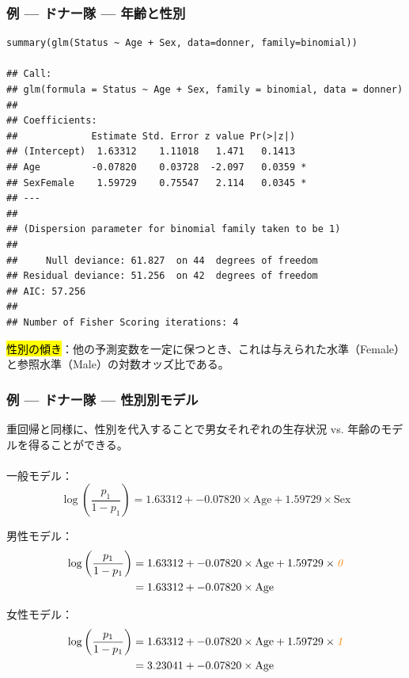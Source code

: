 
\begin{frame}[fragile]
\frametitle{例 --- ドナー隊 --- 年齢と性別}
\vspace{-3mm}
{\tiny
\begin{verbatim}
summary(glm(Status ~ Age + Sex, data=donner, family=binomial))

## Call:
## glm(formula = Status ~ Age + Sex, family = binomial, data = donner)
##
## Coefficients:
##             Estimate Std. Error z value Pr(>|z|)
## (Intercept)  1.63312    1.11018   1.471   0.1413
## Age         -0.07820    0.03728  -2.097   0.0359 *
## SexFemale    1.59729    0.75547   2.114   0.0345 *
## ---
##
## (Dispersion parameter for binomial family taken to be 1)
##
##     Null deviance: 61.827  on 44  degrees of freedom
## Residual deviance: 51.256  on 42  degrees of freedom
## AIC: 57.256
##
## Number of Fisher Scoring iterations: 4
\end{verbatim}
}

\hl{性別の傾き}：他の予測変数を一定に保つとき、これは与えられた水準（Female）と参照水準（Male）の対数オッズ比である。

\end{frame}


\begin{frame}
\frametitle{例 --- ドナー隊 --- 性別別モデル}

重回帰と同様に、性別を代入することで男女それぞれの生存状況 vs. 年齢のモデルを得ることができる。\\
~\\

一般モデル：
{\scriptsize
\[\log\left(\frac{p_1}{1-p_1}\right) = 1.63312 + -0.07820\times\text{Age} + 1.59729\times\text{Sex}\]
}

男性モデル：
{\scriptsize
\begin{align*}
\log\left(\frac{p_1}{1-p_1}\right) &= 1.63312 + -0.07820\times\text{Age} + 1.59729\times\textit{\textcolor{orange}{0}}\\
                                   &= 1.63312 + -0.07820\times\text{Age}
\end{align*}
}

女性モデル：
{\scriptsize
\begin{align*}
\log\left(\frac{p_1}{1-p_1}\right) &= 1.63312 + -0.07820\times\text{Age} + 1.59729\times\textit{\textcolor{orange}{1}}\\
                                   &= 3.23041 + -0.07820\times\text{Age}
\end{align*}
}

\end{frame}


